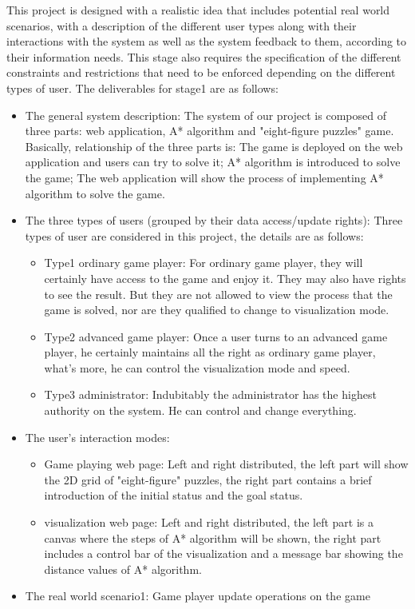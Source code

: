 \textnormal{
This project is designed with a realistic idea that includes potential real world scenarios,
with a description of the different user types along with their interactions with the system
as well as the system feedback to them, according to their information needs.
This stage also requires the specification of the different constraints and restrictions
that need to be enforced depending on the different types of user.
The deliverables for stage1 are as follows:
}


\begin{itemize}
\item{The general system description: }
The system of our project is composed of three parts: web application, A* algorithm and "eight-figure puzzles" game. Basically, relationship of the three parts is: The game is deployed on the web application and users can try to solve it; A* algorithm is introduced to solve the game; The web application will show the process of implementing A* algorithm to solve the game.
\item{The three types of users (grouped by their data access/update rights): }
Three types of user are considered in this project, the details are as follows:

    \begin{itemize}
    \item{Type1 ordinary game player: }
	For ordinary game player, they will certainly have access to the game and enjoy it. They may also have rights to see the result. But they are not allowed to view the process that the game is solved, nor are they qualified to change to visualization mode. 
    \item{Type2 advanced game player: }
	Once a user turns to an advanced game player, he certainly maintains all the right as ordinary game player, what's more, he can control the visualization mode and speed.
	\item{Type3 administrator: }
	Indubitably the administrator has the highest authority on the system. He can control and change everything.
    \end{itemize}
    
\item{The user's interaction modes: }
    \begin{itemize}
    \item{Game playing web page:}
    Left and right distributed, the left part will show the 2D grid of "eight-figure" puzzles, the right part contains a brief introduction of the initial status and the goal status.
    \item{visualization web page:}
    Left and right distributed, the left part is a canvas where the steps of A* algorithm will be shown, the right part includes a control bar of the visualization and a message bar showing the distance values of A* algorithm.
    \end{itemize}
\item{The real world scenario1: }
Game player update operations on the game


\end{itemize}
